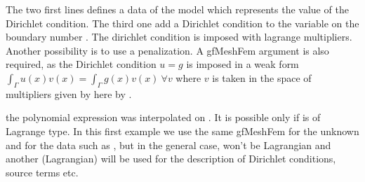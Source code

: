 \documentclass[a4paper,11pt,english]{sphinxmanual}
\begin{document}
\begin{sphinxVerbatim}[commandchars=\\\{\}]
 
     
     
       
\end{sphinxVerbatim}

The two first lines defines a data of the model which represents the value of the
Dirichlet condition. The third one add a Dirichlet condition to the variable 
on the boundary number . The dirichlet condition is imposed with lagrange
multipliers. Another possibility is to use a penalization. A gfMeshFem argument is
also required, as the Dirichlet condition \(u=g\) is imposed in a weak form
\(\int_\Gamma u(x)v(x) = \int_\Gamma g(x)v(x) ~ \forall v\) where \(v\) is
taken in the space of multipliers given by here by .

\begin{sphinxShadowBox}

the polynomial expression was interpolated on . It is possible only if
 is of Lagrange type. In this first example we use the same gfMeshFem for
the unknown and for the data such as , but in the general case, 
won’t be Lagrangian and another (Lagrangian)  will be used for the
description of Dirichlet conditions, source terms etc.
\end{sphinxShadowBox}
\end{document}
